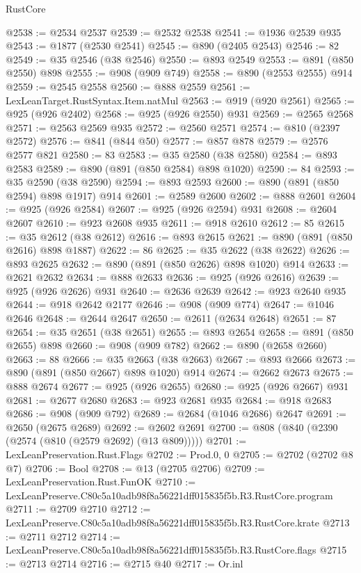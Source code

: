 \begin{lexlean}{RustCore}
\begin{coremodule}
@2538 := @2534 @2537
@2539 := @2532 @2538
@2541 := @1936 @2539 @935
@2543 := @1877 (@2530 @2541)
@2545 := @890 (@2405 @2543)
@2546 := 82
@2549 := @35 @2546 (@38 @2546)
@2550 := @893 @2549
@2553 := @891 (@850 @2550) @898
@2555 := @908 (@909 @749)
@2558 := @890 (@2553 @2555) @914
@2559 := @2545 @2558
@2560 := @888 @2559
@2561 := LexLeanTarget.RustSyntax.Item.natMul
@2563 := @919 (@920 @2561)
@2565 := @925 (@926 @2402)
@2568 := @925 (@926 @2550) @931
@2569 := @2565 @2568
@2571 := @2563 @2569 @935
@2572 := @2560 @2571
@2574 := @810 (@2397 @2572)
@2576 := @841 (@844 @50)
@2577 := @857 @878
@2579 := @2576 @2577 @821
@2580 := 83
@2583 := @35 @2580 (@38 @2580)
@2584 := @893 @2583
@2589 := @890 (@891 (@850 @2584) @898 @1020)
@2590 := 84
@2593 := @35 @2590 (@38 @2590)
@2594 := @893 @2593
@2600 := @890 (@891 (@850 @2594) @898 @1917) @914
@2601 := @2589 @2600
@2602 := @888 @2601
@2604 := @925 (@926 @2584)
@2607 := @925 (@926 @2594) @931
@2608 := @2604 @2607
@2610 := @923 @2608 @935
@2611 := @918 @2610
@2612 := 85
@2615 := @35 @2612 (@38 @2612)
@2616 := @893 @2615
@2621 := @890 (@891 (@850 @2616) @898 @1887)
@2622 := 86
@2625 := @35 @2622 (@38 @2622)
@2626 := @893 @2625
@2632 := @890 (@891 (@850 @2626) @898 @1020) @914
@2633 := @2621 @2632
@2634 := @888 @2633
@2636 := @925 (@926 @2616)
@2639 := @925 (@926 @2626) @931
@2640 := @2636 @2639
@2642 := @923 @2640 @935
@2644 := @918 @2642 @2177
@2646 := @908 (@909 @774)
@2647 := @1046 @2646
@2648 := @2644 @2647
@2650 := @2611 (@2634 @2648)
@2651 := 87
@2654 := @35 @2651 (@38 @2651)
@2655 := @893 @2654
@2658 := @891 (@850 @2655) @898
@2660 := @908 (@909 @782)
@2662 := @890 (@2658 @2660)
@2663 := 88
@2666 := @35 @2663 (@38 @2663)
@2667 := @893 @2666
@2673 := @890 (@891 (@850 @2667) @898 @1020) @914
@2674 := @2662 @2673
@2675 := @888 @2674
@2677 := @925 (@926 @2655)
@2680 := @925 (@926 @2667) @931
@2681 := @2677 @2680
@2683 := @923 @2681 @935
@2684 := @918 @2683
@2686 := @908 (@909 @792)
@2689 := @2684 (@1046 @2686) @2647
@2691 := @2650 (@2675 @2689)
@2692 := @2602 @2691
@2700 := @808 (@840 (@2390 (@2574 (@810 (@2579 @2692) (@13 @809)))))
@2701 := LexLeanPreservation.Rust.Flags
@2702 := Prod.{0, 0}
@2705 := @2702 (@2702 @8 @7)
@2706 := Bool
@2708 := @13 (@2705 @2706)
@2709 := LexLeanPreservation.Rust.FunOK
@2710 := LexLeanPreserve.C80c5a10adb98f8a56221dff015835f5b.R3.RustCore.program
@2711 := @2709 @2710
@2712 := LexLeanPreserve.C80c5a10adb98f8a56221dff015835f5b.R3.RustCore.krate
@2713 := @2711 @2712
@2714 := LexLeanPreserve.C80c5a10adb98f8a56221dff015835f5b.R3.RustCore.flags
@2715 := @2713 @2714
@2716 := @2715 @40
@2717 := Or.inl

\end{coremodule}
\end{lexlean}
